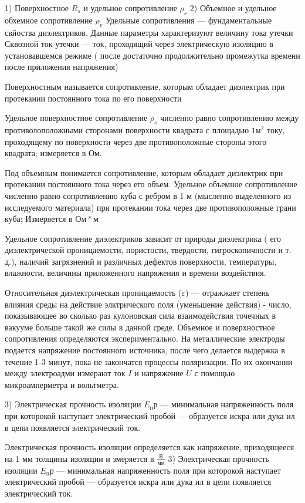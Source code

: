 \documentclass{article}
\begin{document}
1) Поверхностное $R_s$ и удельное сопротивление $\rho_s$
2) Объемное и удельное обхемное сопротивление $\rho_v$
Удельные сопротивления --- фундаментальные свйоства диэлектриков. Данные параметры характеризуют величину тока утечки
Сквозной ток утечки --- ток, проходящий через электрическую изоляцию в установавшемся режиме ( после достаточно продолжительно промежутка времени после приложения напряжения)

Поверхностным называется сопротивление, которым обладает диэлектрик при протекании постоянного тока по его поверхности

Удельное поверхностное сопротивление $\rho_s$ численно равно сопротивлению между противолоположными сторонами поверхности квадрата с площадью $1 м^2$ току, проходящему по поверхности через две противоположные стороны этого квадрата; измеряется в Ом.

Под объемным понимается сопротивление, которым обладает диэлектрик при протекании постоянного тока через его объем.
Удельное объемное сопротивление численно равно сопротивлению куба с ребром в 1 м (мысленно выделенного из исследуемого материала) при протекании тока через две противоположные грани куба; Измеряется в $Ом * м$

Удельное сопротивление диэлектриков зависит от природы диэлектрика ( его диэлектрической проницаемости, пористости, твердости, гигроскопичности и т. д.), наличий загрязнений и различных дефектов поверхности, температуры, влажности, величины приложенного напряжения и времени воздействия.

Относительная диэлектрическая проницаемость ($\varepsilon$) --- отражжает степень влияния среды на действие элктрического поля (уменьшение действия) - число, показывающее во сколько раз кулоновская сила взаимодействия точечных в вакууме больше такой же силы в данной среде.
Объемное и поверхностное сопротивления определяются экспериментально.
На металлические электроды подается напряжение постоянного источника, после чего делается выдержка в течение 1-3 минут, пока не закончатся процессы поляризации. По их окончании между электроадми измерают ток $I$ и напряжение $U$ с помощью микроамперметра и вольтметра.

3) Электрическая прочность изоляции $E_пр$ --- минимальная напряженность поля при которокой наступает электрический пробой --- образуется искра или дука ил в цепи появляется электрический ток.

Электрическая прочность изоляции определяется как напряжение, приходящееся на 1 мм толщины изоляции и змеряется в $\frac {В} {мм}$
3) Электрическая прочность изоляции $E_пр$ --- минимальная напряженность поля при которокой наступает электрический пробой --- образуется искра или дука ил в цепи появляется электрический ток.
\end{document}
